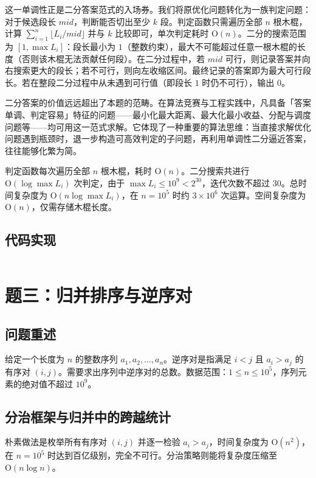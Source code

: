 \documentclass[12pt, a4paper]{academics}
\begin{document}
这一单调性正是二分答案范式的入场券。我们将原优化问题转化为一族判定问题：对于候选段长 $\mathit{mid}$，判断能否切出至少 $k$ 段。判定函数只需遍历全部 $n$ 根木棍，计算 $\sum_{i=1}^{n} \lfloor L_i / \mathit{mid} \rfloor$ 并与 $k$ 比较即可，单次判定耗时 $\mathrm{O}(n)$。二分的搜索范围为 $[1, \max L_i]$：段长最小为 $1$（整数约束），最大不可能超过任意一根木棍的长度（否则该木棍无法贡献任何段）。在二分过程中，若 $\mathit{mid}$ 可行，则记录答案并向右搜索更大的段长；若不可行，则向左收缩区间。最终记录的答案即为最大可行段长。若在整段二分过程中从未遇到可行值（即段长 $1$ 时仍不可行），输出 $0$。

二分答案的价值远远超出了本题的范畴。在算法竞赛与工程实践中，凡具备「答案单调、判定容易」特征的问题——最小化最大距离、最大化最小收益、分配与调度问题等——均可用这一范式求解。它体现了一种重要的算法思维：当直接求解优化问题遇到瓶颈时，退一步构造可高效判定的子问题，再利用单调性二分逼近答案，往往能够化繁为简。

判定函数每次遍历全部 $n$ 根木棍，耗时 $\mathrm{O}(n)$。二分搜索共进行 $\mathrm{O}(\log \max L_i)$ 次判定，由于 $\max L_i \le 10^9 < 2^{30}$，迭代次数不超过 $30$。总时间复杂度为 $\mathrm{O}(n \log \max L_i)$，在 $n = 10^5$ 时约 $3 \times 10^6$ 次运算。空间复杂度为 $\mathrm{O}(n)$，仅需存储木棍长度。

\subsection{代码实现}

\inputminted{c++}{../src/p2_cutting_sticks.cpp}

\section{题三：归并排序与逆序对}

\subsection{问题重述}

给定一个长度为 $n$ 的整数序列 $a_1, a_2, \dots, a_n$。逆序对是指满足 $i < j$ 且 $a_i > a_j$ 的有序对 $(i, j)$。需要求出序列中逆序对的总数。数据范围：$1 \le n \le 10^5$，序列元素的绝对值不超过 $10^9$。

\subsection{分治框架与归并中的跨越统计}

朴素做法是枚举所有有序对 $(i, j)$ 并逐一检验 $a_i > a_j$，时间复杂度为 $\mathrm{O}(n^2)$，在 $n = 10^5$ 时达到百亿级别，完全不可行。分治策略则能将复杂度压缩至 $\mathrm{O}(n \log n)$。
\end{document}
